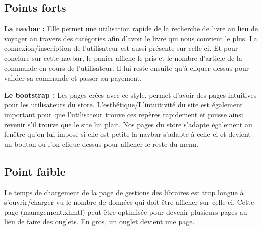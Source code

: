 	\subsection{Points forts}
	\textbf{La navbar :} Elle permet une utilisation rapide de la recherche de livre au lieu de voyager au travers des catégories afin d'avoir le livre qui nous convient le plus. La connexion/inscription de l'utilisateur est aussi présente sur celle-ci. Et pour conclure sur cette navbar, le panier affiche le pris et le nombre d'article de la commande en cours de l'utilisateur. Il lui reste ensuite qu'à cliquer dessus pour valider sa commande et passer au payement.

	\textbf{Le bootstrap :} Les pages crées avec ce style, permet d'avoir des pages intuitives pour les utilisateurs du store. L'esthétique/L'intuitivité du site est également important pour que l'utilisateur trouve ces repères rapidement et puisse ainsi revenir s'il trouve que le site lui plait. 
	Nos pages du store s'adapte également au fenêtre qu'on lui impose si elle est petite la navbar s'adapte à celle-ci et devient un bouton ou l'on clique dessus pour afficher le reste du menu.
 
	\subsection{Point faible}
	Le temps de chargement de la page de gestions des libraires est trop longue à s'ouvrir/charger vu le nombre de données qui doit être afficher sur celle-ci. 
	Cette page (management.xhmtl) peut-être optimisée pour devenir plusieurs pages au lieu de faire des onglets. En gros, un onglet devient une page. 